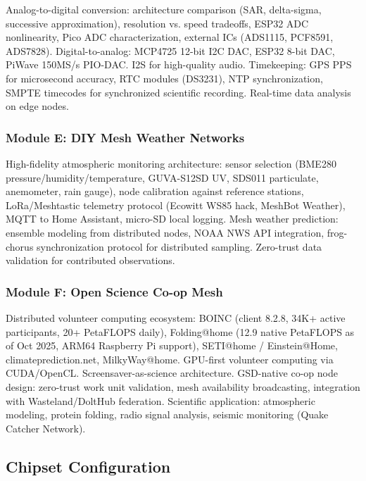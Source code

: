 \documentclass[11pt,letterpaper]{article}
\begin{document}
Analog-to-digital conversion: architecture comparison (SAR, delta-sigma, successive approximation), resolution vs. speed tradeoffs, ESP32 ADC nonlinearity, Pico ADC characterization, external ICs (ADS1115, PCF8591, ADS7828). Digital-to-analog: MCP4725 12-bit I2C DAC, ESP32 8-bit DAC, PiWave 150MS/s PIO-DAC. I2S for high-quality audio. Timekeeping: GPS PPS for microsecond accuracy, RTC modules (DS3231), NTP synchronization, SMPTE timecodes for synchronized scientific recording. Real-time data analysis on edge nodes.

\subsubsection{Module E: DIY Mesh Weather Networks}

High-fidelity atmospheric monitoring architecture: sensor selection (BME280 pressure/humidity/temperature, GUVA-S12SD UV, SDS011 particulate, anemometer, rain gauge), node calibration against reference stations, LoRa/Meshtastic telemetry protocol (Ecowitt WS85 hack, MeshBot Weather), MQTT to Home Assistant, micro-SD local logging. Mesh weather prediction: ensemble modeling from distributed nodes, NOAA NWS API integration, frog-chorus synchronization protocol for distributed sampling. Zero-trust data validation for contributed observations.

\subsubsection{Module F: Open Science Co-op Mesh}

Distributed volunteer computing ecosystem: BOINC (client 8.2.8, 34K+ active participants, 20+ PetaFLOPS daily), Folding@home (12.9 native PetaFLOPS as of Oct 2025, ARM64 Raspberry Pi support), SETI@home / Einstein@Home, climateprediction.net, MilkyWay@home. GPU-first volunteer computing via CUDA/OpenCL. Screensaver-as-science architecture. GSD-native co-op node design: zero-trust work unit validation, mesh availability broadcasting, integration with Wasteland/DoltHub federation. Scientific application: atmospheric modeling, protein folding, radio signal analysis, seismic monitoring (Quake Catcher Network).

\subsection{Chipset Configuration}
\end{document}
